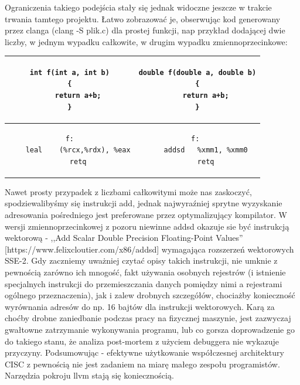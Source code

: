 Ograniczenia takiego podejścia stały się jednak widoczne jeszcze w trakcie trwania tamtego projektu. Łatwo zobrazować je, obserwując kod generowany przez clanga (clang -S plik.c) dla prostej funkcji, nap przykład dodającej dwie liczby, w jednym wypadku całkowite, w drugim wypadku zmiennoprzecinkowe:
\begin{center}
\begin{tabular}{|c | c|}
\hline
\begin{lstlisting}
int f(int a, int b)
{
    return a+b;
}
\end{lstlisting}
&
\begin{lstlisting}
double f(double a, double b)
{
    return a+b;
}
\end{lstlisting}
\\ \hline
\begin{lstlisting}
f:
	leal	(%rcx,%rdx), %eax
	retq
\end{lstlisting}
&
\begin{lstlisting}
f: 
	addsd	%xmm1, %xmm0
	retq
\end{lstlisting}
\\ \hline
\end{tabular}
\end{center}
Nawet prosty przypadek z liczbami całkowitymi może nas zaskoczyć, spodziewalibyśmy się instrukcji add, jednak najwyraźniej sprytne wyzyskanie adresowania pośredniego jest preferowane przez optymalizujący kompilator. W wersji zmiennoprzecinkowej z pozoru niewinne addsd okazuje sie być instrukcją wektorową - ,,Add Scalar Double Precision Floating-Point Values'' [https://www.felixcloutier.com/x86/addsd] wymagająca rozszerzeń wektorowych SSE-2. Gdy zaczniemy uważniej czytać opisy takich instrukcji, nie umknie z pewnością zarówno ich mnogość, fakt używania osobnych rejestrów (i istnienie specjalnych instrukcji do przemieszczania danych pomiędzy nimi a rejestrami ogólnego przeznaczenia), jak i zalew drobnych szczegółów, chociażby konieczność wyrównania adresów do np. 16 bajtów dla instrukcji wektorowych. Karą za choćby drobne zaniedbanie podczas pracy na fizycznej maszynie, jest zazwyczaj gwałtowne zatrzymanie wykonywania programu, lub co gorsza doprowadzenie go do takiego stanu, że analiza post-mortem z użyciem debuggera nie wykazuje przyczyny. Podsumowując - efektywne użytkowanie współczesnej architektury CISC z pewnością nie jest zadaniem na miarę małego zespołu programistów. Narzędzia pokroju llvm stają się koniecznością.

